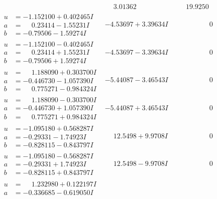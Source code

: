 \documentclass[1p]{elsarticle_modified}
\theoremstyle{definition}
\begin{document}
$$\begin{array}{c|c|c}
 & \phantom{-}3.01362\phantom{ +0.000000I} & \phantom{-}19.9250\phantom{ +0.000000I} \\ \hline\begin{aligned}
u &= -1.152100 + 0.402465 I \\
a &= \phantom{-}0.23414 - 1.55231 I \\
b &= -0.79506 - 1.59274 I\end{aligned}
 & -4.53697 + 3.39634 I & \phantom{-0.000000 } 0 \\ \hline\begin{aligned}
u &= -1.152100 - 0.402465 I \\
a &= \phantom{-}0.23414 + 1.55231 I \\
b &= -0.79506 + 1.59274 I\end{aligned}
 & -4.53697 - 3.39634 I & \phantom{-0.000000 } 0 \\ \hline\begin{aligned}
u &= \phantom{-}1.188090 + 0.303700 I \\
a &= -0.446730 - 1.057390 I \\
b &= \phantom{-}0.775271 - 0.984324 I\end{aligned}
 & -5.44087 - 3.46543 I & \phantom{-0.000000 } 0 \\ \hline\begin{aligned}
u &= \phantom{-}1.188090 - 0.303700 I \\
a &= -0.446730 + 1.057390 I \\
b &= \phantom{-}0.775271 + 0.984324 I\end{aligned}
 & -5.44087 + 3.46543 I & \phantom{-0.000000 } 0 \\ \hline\begin{aligned}
u &= -1.095180 + 0.568287 I \\
a &= -0.29331 - 1.74923 I \\
b &= -0.828115 - 0.843797 I\end{aligned}
 & \phantom{-}12.5498 + 9.9708 I & \phantom{-0.000000 } 0 \\ \hline\begin{aligned}
u &= -1.095180 - 0.568287 I \\
a &= -0.29331 + 1.74923 I \\
b &= -0.828115 + 0.843797 I\end{aligned}
 & \phantom{-}12.5498 - 9.9708 I & \phantom{-0.000000 } 0 \\ \hline\begin{aligned}
u &= \phantom{-}1.232980 + 0.122197 I \\
a &= -0.336685 - 0.619050 I \\

\end{aligned}
\end{array}$$
\end{document}
